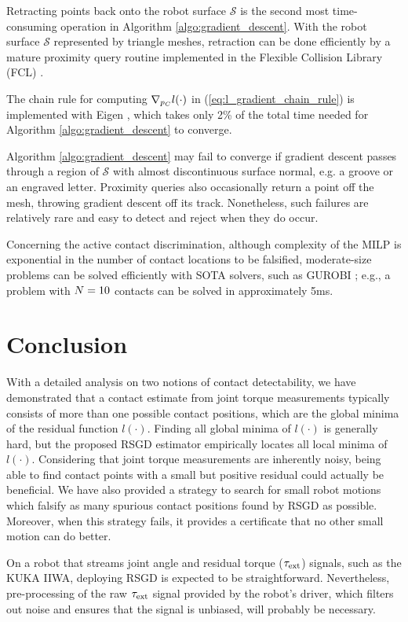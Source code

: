 Retracting points back onto the robot surface $\mathcal{S}$ is the second most time-consuming operation in Algorithm \ref{algo:gradient_descent}. With the robot surface $\mathcal{S}$ represented by triangle meshes, retraction can be done efficiently by a mature proximity query routine implemented in the Flexible Collision Library (FCL) \cite{pan2012fcl}. 

The chain rule for computing $\nabla_{p_{C}} l(\cdot)$ in (\ref{eq:l_gradient_chain_rule}) is implemented with Eigen \cite{eigenweb}, which takes only 2\% of the total time needed for Algorithm \ref{algo:gradient_descent} to converge.

Algorithm \ref{algo:gradient_descent} may fail to converge if gradient descent passes through a region of $\mathcal{S}$ with almost discontinuous surface normal, e.g. a groove or an engraved letter. Proximity queries also occasionally return a point off the mesh, throwing gradient descent off its track. Nonetheless, such failures are relatively rare and easy to detect and reject when they do occur.

Concerning the active contact discrimination, although complexity of the MILP is exponential in the number of contact locations to be falsified, moderate-size problems can be solved efficiently with SOTA solvers, such as GUROBI \cite{gurobi}; e.g., a problem with $N=10$ contacts can be solved in approximately 5ms.


\section{Conclusion}
With a detailed analysis on two notions of contact detectability, we have demonstrated that a contact estimate from joint torque measurements typically consists of more than one possible contact positions, which are the global minima of the residual function $l(\cdot)$. 
Finding all global minima of $l(\cdot)$ is generally hard, but the proposed RSGD estimator empirically locates all local minima of $l(\cdot)$. 
Considering that joint torque measurements are inherently noisy, being able to find contact points with a small but positive residual could actually be beneficial. 
We have also provided a strategy to search for small robot motions which falsify as many spurious contact positions found by RSGD as possible. Moreover, when this strategy fails, it provides a certificate that no other small motion can do better.

On a robot that streams joint angle and residual torque ($\tau_{\text{ext}}$) signals, such as the KUKA IIWA, deploying RSGD is expected to be straightforward. Nevertheless, pre-processing of the raw $\tau_{\text{ext}}$ signal provided by the robot's driver, which filters out noise and ensures that the signal is unbiased, will probably be necessary.
